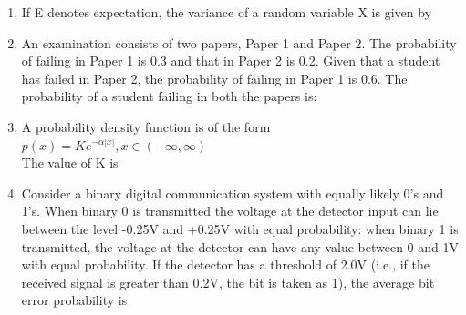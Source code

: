 \documentclass[journal,12pt,twocolumn]{IEEEtran}
\begin{document}
\begin{enumerate}
\item If E denotes expectation, the variance of a random variable X is given by
\begin{enumerate}
\end{enumerate}
%
\solution


\item An examination consists of two papers, Paper 1 and Paper 2. The probability of failing in Paper 1 is 0.3 and that in Paper 2 is 0.2. Given that a student has failed in Paper 2, the probability of failing in Paper 1 is 0.6. The probability  of a student failing in both the papers is:
\begin{enumerate}
\end{enumerate}

\item A probability density function is of the form\\
{\centering $p(\textit{x}) = Ke^{-\alpha |x|}, \textit{x}\in(-\infty,\infty)$\\}
The value of K is 

\begin{enumerate}
\end{enumerate}

\item Consider a binary digital communication system with equally likely 0's and 1's. When binary 0 is transmitted the voltage at the detector input can lie between the level -0.25V and +0.25V with equal probability: when binary 1 is transmitted, the voltage at the detector can have any value between 0 and 1V with equal probability. If the detector has a threshold of 2.0V (i.e., if the received signal is greater than 0.2V, the bit is taken as 1), the average bit error probability is
\begin{enumerate}
\begin{multicols}{4}
\setlength\itemsep{2em}


\end{multicols}
\end{enumerate}
\end{enumerate}
\end{document}
